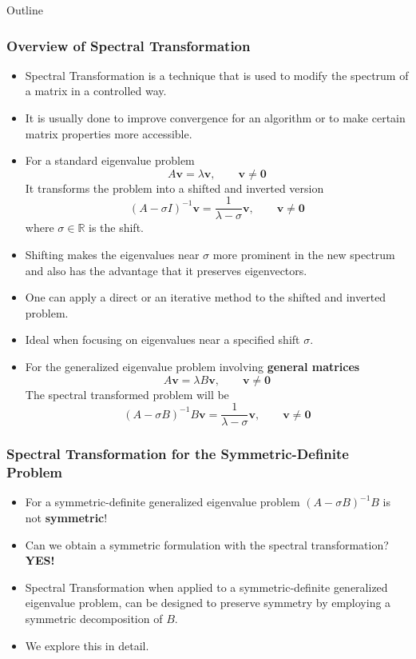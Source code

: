 \documentclass[landscape]{beamer}
\begin{document}
\begin{frame}[allowframebreaks]{Outline}
	\frametitle{Overview of Spectral Transformation}
	\begin{itemize}
		\item Spectral Transformation is a technique that is used to modify the spectrum of a matrix in a controlled way.
		\item It is usually done to improve convergence for an algorithm or to make certain matrix properties more accessible.
		\item For a standard eigenvalue problem
		\begin{equation*}
			A\mathbf{v} = \lambda \mathbf{v},\qquad \mathbf{v} \neq \mathbf{0}
		\end{equation*}
		It transforms the problem into a shifted and inverted version
		\begin{equation*}
			(A - \sigma I)^{-1} \mathbf{v} = \frac{1}{\lambda - \sigma} \mathbf{v}, \qquad \mathbf{v} \neq \mathbf{0}
		\end{equation*}
		where $\sigma \in \mathbb{R}$ is the shift.
		\item Shifting makes the eigenvalues near $\sigma$ more prominent in the new spectrum and also has the advantage that it preserves eigenvectors.
		\item  One can apply a direct or an iterative method to the shifted and inverted problem.
		\item Ideal when focusing on eigenvalues near a specified shift $\sigma$.
		\item  For the generalized eigenvalue problem involving \textbf{general matrices}
		\begin{equation*}
			A\mathbf{v} = \lambda B\mathbf{v}, \qquad \mathbf{v} \neq \mathbf{0}
		\end{equation*}
		The spectral transformed problem will be
		\begin{equation*}
			(A - \sigma B)^{-1}B\mathbf{v} = \frac{1}{\lambda - \sigma}\mathbf{v}, \qquad \mathbf{v} \neq \mathbf{0}
		\end{equation*} 
	\end{itemize}
\end{frame}

\begin{frame}
	\frametitle{Spectral Transformation for the Symmetric-Definite Problem}
	\begin{itemize}
		\item  For a symmetric-definite generalized eigenvalue problem $(A - \sigma B)^{-1}B$ is not \textbf{symmetric}!
		\item Can we obtain a symmetric formulation with the spectral transformation? \textbf{YES!}
		\item Spectral Transformation when applied to a symmetric-definite generalized eigenvalue problem, can be designed to preserve symmetry by employing a symmetric decomposition of $B$.
		\item We explore this in detail.
	\end{itemize}
\end{frame}
\end{document}
